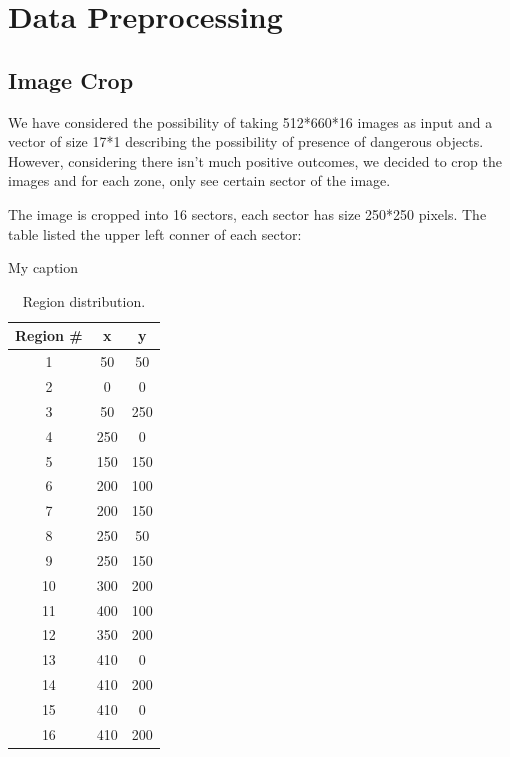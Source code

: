 \documentclass[conference,compsoc]{IEEEtran}
\begin{document}
\section{Data Preprocessing}
	\subsection{Image Crop}
		\par We have considered the possibility of taking 512*660*16 images as input and a vector of size 17*1 describing the possibility of presence of dangerous objects. However, considering there isn't much positive outcomes, we decided to crop the images and for each zone, only see certain sector of the image.
		\par The image is cropped into 16 sectors, each sector has size 250*250 pixels. The table listed the upper left conner of each sector:
		\begin{table}[h]
			\centering
			\caption{My caption}
			\label{my-label}
			\begin{tabular}{ccc}
				\hline
				Region \# & x   & y   \\ \hline
				1         & 50  & 50  \\ \hline
				2         & 0   & 0   \\ \hline
				3         & 50  & 250 \\ \hline
				4         & 250 & 0   \\ \hline
				5         & 150 & 150 \\ \hline
				6         & 200 & 100 \\ \hline
				7         & 200 & 150 \\ \hline
				8         & 250 & 50  \\ \hline
				9         & 250 & 150 \\ \hline
				10        & 300 & 200 \\ \hline
				11        & 400 & 100 \\ \hline
				12        & 350 & 200 \\ \hline
				13        & 410 & 0   \\ \hline
				14        & 410 & 200 \\ \hline
				15        & 410 & 0   \\ \hline
				16        & 410 & 200 \\ \hline
			\end{tabular}
			\caption{Region distribution.}
		\end{table}
\end{document}
